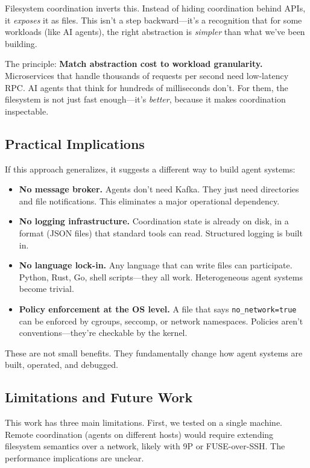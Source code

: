 \documentclass[11pt]{article}
\begin{document}
Filesystem coordination inverts this. Instead of hiding coordination behind APIs, it \emph{exposes} it as files. This isn't a step backward---it's a recognition that for some workloads (like AI agents), the right abstraction is \emph{simpler} than what we've been building.

The principle: \textbf{Match abstraction cost to workload granularity.} Microservices that handle thousands of requests per second need low-latency RPC. AI agents that think for hundreds of milliseconds don't. For them, the filesystem is not just fast enough---it's \emph{better}, because it makes coordination inspectable.

\subsection{Practical Implications}

If this approach generalizes, it suggests a different way to build agent systems:

\begin{itemize}
\item \textbf{No message broker.} Agents don't need Kafka. They just need directories and file notifications. This eliminates a major operational dependency.

\item \textbf{No logging infrastructure.} Coordination state is already on disk, in a format (JSON files) that standard tools can read. Structured logging is built in.

\item \textbf{No language lock-in.} Any language that can write files can participate. Python, Rust, Go, shell scripts---they all work. Heterogeneous agent systems become trivial.

\item \textbf{Policy enforcement at the OS level.} A file that says \texttt{no\_network=true} can be enforced by cgroups, seccomp, or network namespaces. Policies aren't conventions---they're checkable by the kernel.
\end{itemize}

These are not small benefits. They fundamentally change how agent systems are built, operated, and debugged.

\subsection{Limitations and Future Work}

This work has three main limitations. First, we tested on a single machine. Remote coordination (agents on different hosts) would require extending filesystem semantics over a network, likely with 9P or FUSE-over-SSH. The performance implications are unclear.
\end{document}
